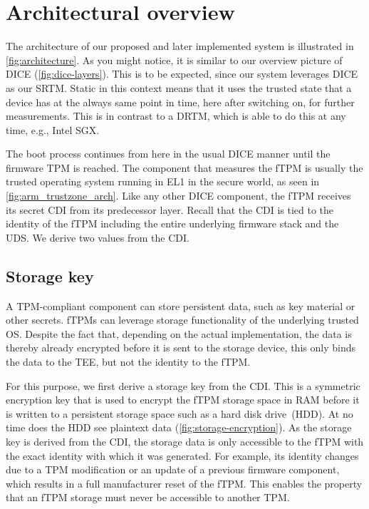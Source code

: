 \section{Architectural overview}\label{sec:arch_overview}



The architecture of our proposed and later implemented system is illustrated in \autoref{fig:architecture}.
As you might notice, it is similar to our overview picture of \ac{DICE} (\autoref{fig:dice-layers}).
This is to be expected, since our system leverages \ac{DICE} as our \ac{SRTM}.
Static in this context means that it uses the trusted state that a device has at the always same point in time, here after switching on, for further measurements.
This is in contrast to a \ac{DRTM}, which is able to do this at any time, e.g., Intel SGX\@.

The boot process continues from here in the usual \ac{DICE} manner until the firmware TPM is reached.
The component that measures the \ac{fTPM} is usually the trusted operating system running in EL1 in the secure world, as seen in \autoref{fig:arm_trustzone_arch}.
Like any other \ac{DICE} component, the \ac{fTPM} receives its secret \ac{CDI} from its predecessor layer.
Recall that the \ac{CDI} is tied to the identity of the \ac{fTPM} including the entire underlying firmware stack and the \ac{UDS}\@.
We derive two values from the \ac{CDI}\@.

\subsection{Storage key}


A TPM-compliant component can store persistent data, such as key material or other secrets.
\Acp{fTPM} can leverage storage functionality of the underlying trusted OS\@.
Despite the fact that, depending on the actual implementation, the data is thereby already encrypted before it is sent to the storage device, this only binds the data to the \ac{TEE}, but not the identity to the \ac{fTPM}.

For this purpose, we first derive a storage key from the \ac{CDI}.
This is a symmetric encryption key that is used to encrypt the \ac{fTPM} storage space in RAM before it is written to a persistent storage space such as a hard disk drive~(HDD).
At no time does the HDD see plaintext data (\autoref{fig:storage-encryption}).
As the storage key is derived from the \ac{CDI}, the storage data is only accessible to the \ac{fTPM} with the exact identity with which it was generated.
For example, its identity changes due to a \ac{TPM} modification or an update of a previous firmware component, which results in a full manufacturer reset of the fTPM\@.
This enables the property that an \ac{fTPM} storage must never be accessible to another \ac{TPM}\@.

